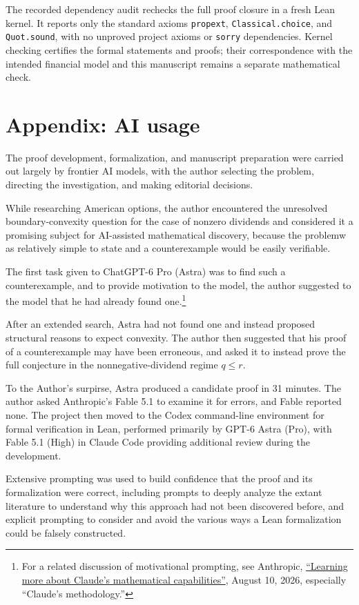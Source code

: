 \documentclass[11pt]{article}
\begin{document}
The recorded dependency audit rechecks the full proof closure in a
fresh Lean kernel. It reports only the standard axioms
\texttt{propext}, \texttt{Classical.choice}, and \texttt{Quot.sound},
with no unproved project axioms or \texttt{sorry} dependencies.
Kernel checking certifies the formal statements and proofs; their
correspondence with the intended financial model and this manuscript
remains a separate mathematical check.

\appendix
\section*{Appendix: AI usage}\label{app:ai}

The proof development, formalization, and manuscript preparation were
carried out largely by frontier AI models, with the author selecting the problem, directing the investigation, and making editorial decisions.

While researching American options, the author encountered the
unresolved boundary-convexity question for the case of nonzero dividends and considered
it a promising subject for AI-assisted mathematical discovery, because the problemw as relatively simple to state
and a counterexample would be easily verifiable.

The first task given to ChatGPT-6 Pro (Astra) was to find such a
counterexample, and to provide motivation to the model, the author suggested to the model that he had already found one.\footnote{For a related discussion of motivational prompting, see Anthropic,
\href{https://www.anthropic.com/research/riemann-zeta}{``Learning more about Claude's mathematical capabilities''},
August 10, 2026, especially ``Claude's methodology.''}

After an extended search, Astra had not found one
and instead proposed structural reasons to expect convexity.
The author then suggested that his proof of a counterexample may have been erroneous, and asked it to instead prove the full conjecture in the
nonnegative-dividend regime $q\le r$.

To the Author's surpirse, Astra produced a candidate proof in 31 minutes. The author asked Anthropic's
Fable 5.1 to examine it for errors, and Fable reported none.
The project then moved to the Codex command-line environment for
formal verification in Lean, performed primarily by GPT-6 Astra (Pro),
with Fable 5.1 (High) in Claude Code providing additional review during the development.

Extensive prompting was used to build confidence that the proof and its formalization were correct, including prompts
to deeply analyze the extant literature to understand why this approach had not been discovered before,
and explicit prompting to consider and avoid the various ways a Lean formalization could be falsely constructed.
\end{document}
